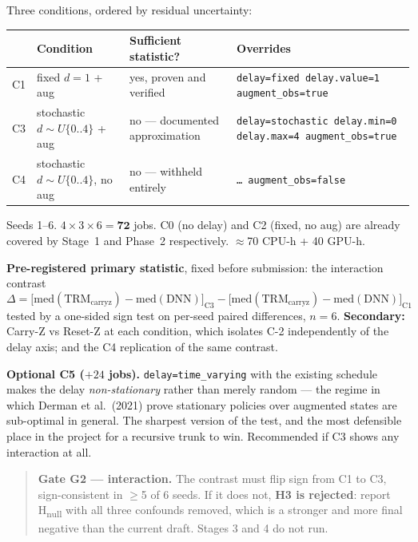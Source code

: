 \documentclass[11pt]{article}
\newcommand{\code}[1]{\texttt{\small #1}}
\newcommand{\gate}[1]{\textcolor{gateamber}{\textbf{#1}}}
\begin{document}
Three conditions, ordered by residual uncertainty:

\begin{center}\small
\begin{tabular}{@{}llp{}p{}@{}}
\toprule
 & \textbf{Condition} & \textbf{Sufficient statistic?} & \textbf{Overrides} \\
\midrule
C1 & fixed $d{=}1$ + aug & yes, proven and verified & \code{delay=fixed delay.value=1 augment\_obs=true} \\
C3 & stochastic $d \sim U\{0..4\}$ + aug & no --- documented approximation & \code{delay=stochastic delay.min=0 delay.max=4 augment\_obs=true} \\
C4 & stochastic $d \sim U\{0..4\}$, no aug & no --- withheld entirely & \code{\dots\ augment\_obs=false} \\
\bottomrule
\end{tabular}
\end{center}

Seeds 1--6. $4 \times 3 \times 6 = \mathbf{72}$ jobs. C0 (no delay) and C2 (fixed, no aug) are already covered by Stage~1 and Phase~2 respectively. $\approx$70 CPU-h + 40 GPU-h.

\textbf{Pre-registered primary statistic}, fixed before submission: the interaction contrast
\[
\Delta = \bigl[\mathrm{med}(\text{TRM}_{\text{carryz}}) - \mathrm{med}(\text{DNN})\bigr]_{\text{C3}} - \bigl[\mathrm{med}(\text{TRM}_{\text{carryz}}) - \mathrm{med}(\text{DNN})\bigr]_{\text{C1}}
\]
tested by a one-sided sign test on per-seed paired differences, $n = 6$. \textbf{Secondary:} Carry-Z vs Reset-Z at each condition, which isolates C-2 independently of the delay axis; and the C4 replication of the same contrast.

\textbf{Optional C5 ($+24$ jobs).} \code{delay=time\_varying} with the existing schedule makes the delay \emph{non-stationary} rather than merely random --- the regime in which Derman et al.\ (2021) prove stationary policies over augmented states are sub-optimal in general. The sharpest version of the test, and the most defensible place in the project for a recursive trunk to win. Recommended if C3 shows any interaction at all.

\begin{quote}
\gate{Gate G2 --- interaction.} The contrast must flip sign from C1 to C3, sign-consistent in $\geq$5 of 6 seeds. If it does not, \textbf{H3 is rejected}: report H\textsubscript{null} with all three confounds removed, which is a stronger and more final negative than the current draft. Stages 3 and 4 do not run.
\end{quote}
\end{document}
